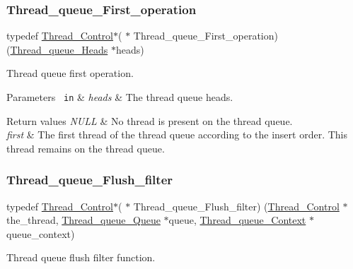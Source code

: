 \subsubsection{\texorpdfstring{Thread\_queue\_First\_operation}{Thread\_queue\_First\_operation}}
{\footnotesize\ttfamily typedef \mbox{\hyperlink{struct__Thread__Control}{Thread\+\_\+\+Control}}$\ast$( $\ast$ Thread\+\_\+queue\+\_\+\+First\+\_\+operation) (\mbox{\hyperlink{group__RTEMSScoreThreadQueue_gaebac32033b009cc8f606a90bd389f8e9}{Thread\+\_\+queue\+\_\+\+Heads}} $\ast$heads)}



Thread queue first operation. 


\begin{DoxyParams}[1]{Parameters}
\mbox{\texttt{ in}}  & {\em heads} & The thread queue heads.\\
\hline
\end{DoxyParams}

\begin{DoxyRetVals}{Return values}
{\em N\+U\+LL} & No thread is present on the thread queue. \\
\hline
{\em first} & The first thread of the thread queue according to the insert order. This thread remains on the thread queue. \\
\hline
\end{DoxyRetVals}
\mbox{\label{group__RTEMSScoreThreadQueue_ga66aee78bfdca4bd829cdedf18e7c2451}} 
\subsubsection{\texorpdfstring{Thread\_queue\_Flush\_filter}{Thread\_queue\_Flush\_filter}}
{\footnotesize\ttfamily typedef \mbox{\hyperlink{struct__Thread__Control}{Thread\+\_\+\+Control}}$\ast$( $\ast$ Thread\+\_\+queue\+\_\+\+Flush\+\_\+filter) (\mbox{\hyperlink{struct__Thread__Control}{Thread\+\_\+\+Control}} $\ast$the\+\_\+thread, \mbox{\hyperlink{structThread__queue__Queue}{Thread\+\_\+queue\+\_\+\+Queue}} $\ast$queue, \mbox{\hyperlink{structThread__queue__Context}{Thread\+\_\+queue\+\_\+\+Context}} $\ast$queue\+\_\+context)}



Thread queue flush filter function. 

